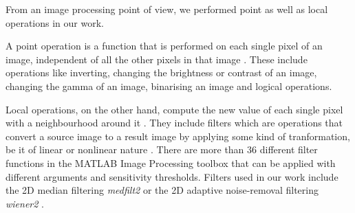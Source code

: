 From an image processing point of view, we performed point as well as local operations in our work.

A point operation is a function that is performed on each single pixel of an image, independent of all the other pixels in that image \cite{maini2010comprehensive}. These include operations like inverting, changing the brightness or contrast of an image, changing the gamma of an image, binarising an image and logical operations. 

Local operations, on the other hand, compute the new value of each single pixel with a neighbourhood around it \cite{pointOperation2018}. %
They include filters which are operations that convert a source image to a result image by applying some kind of tranformation, be it of linear or nonlinear nature \cite{pointOperation2018}. There are more than 36 different filter functions in the MATLAB Image Processing toolbox \cite{matlab} that can be applied with different arguments and sensitivity thresholds. Filters used in our work include the 2D median filtering \textit{medfilt2} or the 2D adaptive noise-removal filtering \textit{wiener2} \cite{matlab}.





